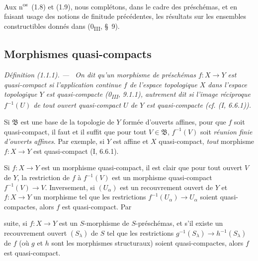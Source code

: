 \documentclass[10pt,oneside]{book}
\makeatletter
\newcommand{\setmanualcurrentlabel}[1]{\def\@currentlabel{#1}}
\newcommand{\oldpage}[2][]{%
  \setcounter{footnote}{0}%
  \marginpar{\scriptsize\textbf{#1}~|~#2}\ignorespaces}
\newenvironment{definition}[1][]{%
  \setmanualcurrentlabel{#1}\par\medskip\noindent\itshape Définition (#1). ---\ }{\par}
\makeatother
\begin{document}
Aux n\textsuperscript{os}~(1.8) et (1.9), nous complétons, dans le cadre des
préschémas, et en faisant usage des notions de finitude précédentes, les
résultats sur les ensembles constructibles donnés dans
(0\textsubscript{III}, §~9).

\subsection{Morphismes quasi-compacts}
\label{subsection:IV.1.1-fr}

\begin{definition}[1.1.1]
\label{IV.1.1.1-fr}
On dit qu'un morphisme de préschémas $f:X\to Y$ est \emph{quasi-compact} si
l'application continue $f$ de l'espace topologique $X$ dans l'espace
topologique $Y$ est quasi-compacte (0\textsubscript{III}, 9.1.1), autrement
dit si l'image réciproque $f^{-1}(U)$ de tout ouvert quasi-compact $U$ de $Y$
est quasi-compacte (cf. (I, 6.6.1)).
\end{definition}

Si $\mathfrak B$ est une base de la topologie de $Y$ formée d'ouverts
affines, pour que $f$ soit quasi-compact, il faut et il suffit que pour tout
$V\in\mathfrak B$, $f^{-1}(V)$ soit \emph{réunion finie d'ouverts affines}.
Par exemple, si $Y$ est affine et $X$ quasi-compact, \emph{tout} morphisme
$f:X\to Y$ est quasi-compact (I, 6.6.1).

Si $f:X\to Y$ est un morphisme quasi-compact, il est clair que pour tout
ouvert $V$ de $Y$, la restriction de $f$ à $f^{-1}(V)$ est un morphisme
quasi-compact $f^{-1}(V)\to V$. Inversement, si $(U_\alpha)$ est un
recouvrement ouvert de $Y$ et $f:X\to Y$ un morphisme tel que les restrictions
$f^{-1}(U_\alpha)\to U_\alpha$ soient quasi-compactes, alors $f$ est
quasi-compact. Par

\oldpage[IV-1]{225}

suite, si $f:X\to Y$ est un $S$-morphisme de $S$-préschémas, et s'il existe
un recouvrement ouvert $(S_\lambda)$ de $S$ tel que les restrictions
$g^{-1}(S_\lambda)\to h^{-1}(S_\lambda)$ de $f$ (où $g$ et $h$ sont les
morphismes structuraux) soient quasi-compactes, alors $f$ est quasi-compact.
\end{document}
